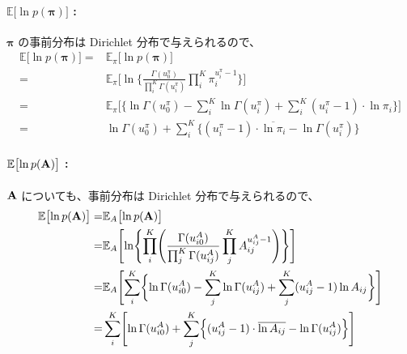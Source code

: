 \paragraph{ $\mathbb{E}\bigl[\ln p({\boldsymbol \pi}) \bigr]$ : }
${\boldsymbol \pi}$ の事前分布は Dirichlet 分布で与えられるので、
\begin{align}
  \mathbb{E}\bigl[\ln p({\boldsymbol \pi}) \bigr]  =&  \mathbb{E}_{\pi}\bigl[ \ln p({\boldsymbol \pi}) \bigr]  \\
  =&  \mathbb{E}_{\pi}\Biggl[ \ln \biggl\{ \frac{\Gamma(u_0^\pi)}{\prod_i^K \Gamma(u_i^\pi)} \prod_i^K \pi_i^{u_i^\pi - 1} \biggr\} \Biggr]  \\
  =&  \mathbb{E}_{\pi}\Biggl[ \biggl\{ \ln\Gamma(u_0^\pi) - \sum_i^K \ln\Gamma(u_i^\pi) + \sum_i^K (u_i^\pi - 1) \cdot \ln \pi_i \biggr\} \Biggr]  \\
  =&  \ln\Gamma(u_0^\pi) + \sum_i^K \biggl\{ (u_i^\pi - 1) \cdot \overline{\ln \pi_i} - \ln\Gamma(u_i^\pi)\biggr\}  \label{eqn:expLnPPi}
\end{align}

\paragraph{ $\mathbb{E}\bigl[\ln p({\bf A}) \bigr]$ : }
${\bf A}$ についても、事前分布は Dirichlet 分布で与えられるので、
\begin{align}
  \mathbb{E}\bigl[\ln p({\bf A}) \bigr]  =&  \mathbb{E}_{A}\bigl[ \ln p({\bf A}) \bigr]  \\
  =&  \mathbb{E}_{A}\Biggl[ \ln \Biggl\{ \prod_i^K \Biggl( \frac{\Gamma(u_{i0}^A)}{ \prod_j^K \Gamma(u_{ij}^A)} \prod_j^K A_{ij}^{u_{ij}^A - 1} \Biggr) \Biggr\} \Biggr]  \\
  =&  \mathbb{E}_{A}\Biggl[ \sum_i^K \biggl\{ \ln\Gamma(u_{i0}^A) - \sum_j^K \ln\Gamma(u_{ij}^A) + \sum_j^K (u_{ij}^A - 1) \ln A_{ij} \biggr\} \Biggr]  \\
  =&  \sum_i^K \Biggl[ \ln\Gamma(u_{i0}^A) + \sum_j^K \Bigl\{ (u_{ij}^A - 1) \cdot \overline{\ln A_{ij}} - \ln\Gamma(u_{ij}^A) \Bigr\} \Biggr]  \label{eqn:expLnPA}
\end{align}

